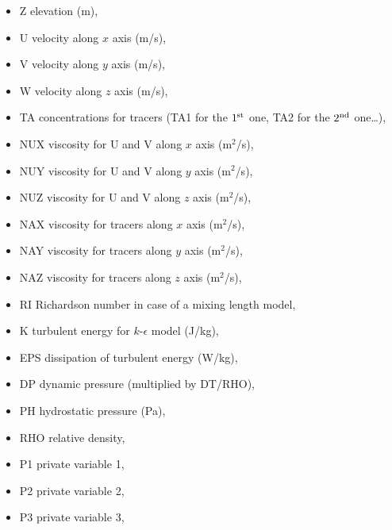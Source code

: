 \begin{itemize}
\item Z elevation (m),

\item U velocity along $x$ axis (m/s),

\item V velocity along $y$ axis (m/s),

\item W velocity along $z$ axis (m/s),

\item TA concentrations for tracers (TA1 for the ${1}^{\rm{st}}$ one, TA2 for the
${2}^{\rm{nd}}$ one\dots ),

\item NUX viscosity for U and V along $x$ axis (m${}^{2}$/s),

\item NUY viscosity for U and V along $y$ axis (m${}^{2}$/s),

\item NUZ viscosity for U and V along $z$ axis (m${}^{2}$/s),

\item NAX viscosity for tracers along $x$ axis (m${}^{2}$/s),

\item NAY viscosity for tracers along $y$ axis (m${}^{2}$/s),

\item NAZ viscosity for tracers along $z$ axis (m${}^{2}$/s),

\item RI Richardson number in case of a mixing length model,

\item K turbulent energy for $k$-$\epsilon$ model (J/kg),

\item EPS dissipation of turbulent energy (W/kg),

\item DP dynamic pressure (multiplied by DT/RHO),

\item PH hydrostatic pressure (Pa),

\item RHO relative density,

\item P1 private variable 1,

\item P2 private variable 2,

\item P3 private variable 3,


\end{itemize}
